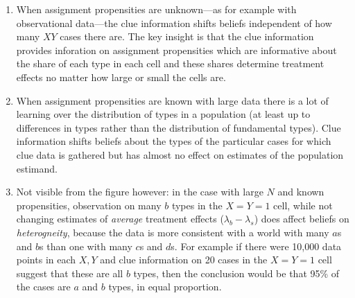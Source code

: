 \documentclass[12pt,]{book}
\begin{document}
\begin{enumerate}
\def\labelenumi{\arabic{enumi}.}
\item
  When assignment propensities are unknown---as for example with observational data---the clue information shifts beliefs independent of how many \(XY\) cases there are. The key insight is that the clue information provides inforation on assignment propensities which are informative about the share of each type in each cell and these shares determine treatment effects no matter how large or small the cells are.
\item
  When assignment propensities are known with large data there is a lot of learning over the distribution of types in a population (at least up to differences in types rather than the distribution of fundamental types). Clue information shifts beliefs about the types of the particular cases for which clue data is gathered but has almost no effect on estimates of the population estimand.
\item
  Not visible from the figure however: in the case with large \(N\) and known propensities, observation on many \(b\) types in the \(X=Y=1\) cell, while not changing estimates of \emph{average} treatment effects (\(\lambda_b- \lambda_s\)) does affect beliefs on \emph{heterogneity}, because the data is more consistent with a world with many \(a\)s and \(b\)s than one with many \(c\)s and \(d\)s. For example if there were 10,000 data points in each \(X,Y\) and clue information on 20 cases in the \(X=Y=1\) cell suggest that these are all \(b\) types, then the conclusion would be that 95\% of the cases are \(a\) and \(b\) types, in equal proportion.
\end{enumerate}
\end{document}

